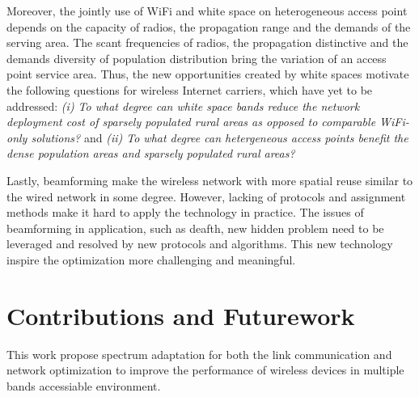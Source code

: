 Moreover, the jointly use of WiFi and white space on heterogeneous 
access point depends on the capacity of radios, the propagation range 
and the demands of the serving area. The scant frequencies of radios, 
the propagation distinctive and the demands diversity of population 
distribution bring the variation of an access point service area. 
Thus, the new opportunities created by white spaces motivate the following 
questions for wireless Internet carriers, which have yet to be addressed: 
{\it (i) To what degree can white space bands reduce the network deployment 
cost of sparsely populated rural areas as opposed to comparable WiFi-only 
solutions?} and {\it (ii) To what degree can hetergeneous access points 
benefit the dense population areas and sparsely populated rural areas?}

Lastly, beamforming make the wireless network with more spatial reuse 
similar to the wired network in some degree. However, lacking of protocols 
and assignment methods make it hard to apply the technology in practice. 
The issues of beamforming in application, such as deafth, new hidden 
problem need to be leveraged and resolved by new protocols and algorithms. 
This new technology inspire the optimization more challenging and meaningful.

\section{Contributions and Futurework}

This work propose spectrum adaptation for both the link communication and 
network optimization to improve the performance of wireless devices in 
multiple bands accessiable environment.

